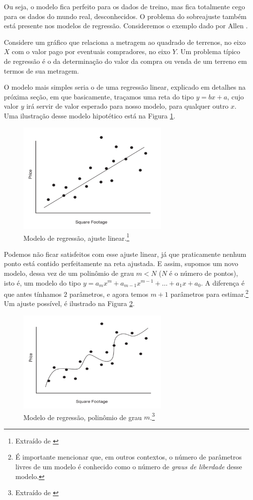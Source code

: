 Ou seja, o modelo fica perfeito para os dados de treino, mas fica totalmente cego para os dados do mundo real, desconhecidos. O problema do sobreajuste também está presente nos modelos de regressão. Consideremos o exemplo dado por Allen \citep{allen}.

Considere um gráfico que relaciona a metragem ao quadrado de terrenos, no eixo $X$ com o valor pago por eventuais compradores, no eixo $Y$. Um problema típico de regressão é o da determinação do valor da compra ou venda de um terreno em termos de sua metragem. 

O modelo mais simples seria o de uma regressão linear, explicado em detalhes na próxima seção, em que basicamente, traçamos uma reta do tipo $y = bx + a$, cujo valor $y$ irá servir de valor esperado para nosso modelo, para qualquer outro $x$. Uma ilustração desse modelo hipotético está na Figura \ref{fig:over_reg_1}.

\begin{figure}[htb]
\centering
\includegraphics[width=7.5cm]{figuras/over_reg_1}
\caption{Modelo de regressão, ajuste linear.\footnote{Extraído de \citep{allen}}}
\label{fig:over_reg_1}
\end{figure}

Podemos não ficar satisfeitos com esse ajuste linear, já que praticamente nenhum ponto está contido perfeitamente na reta ajustada. E assim, supomos um novo modelo, dessa vez de um polinômio de grau $m < N$ ($N$ é o número de pontos), isto é, um modelo do tipo $y = a_mx^m + a_{m-1}x^{m-1} + \ldots + a_1x + a_0$. A diferença é que antes tínhamos $2$ parâmetros, e agora temos $m{+}1$ parâmetros para estimar.\footnote{É importante mencionar que, em outros contextos, o número de parâmetros livres de um modelo é conhecido como o número de \emph{graus de liberdade} desse modelo.} Um ajuste possível, é ilustrado na Figura \ref{fig:over_reg_2}.

\begin{figure}[htb]
\centering
\includegraphics[width=7.5cm]{figuras/over_reg_2}
\caption{Modelo de regressão, polinômio de grau $m$.\footnote{Extraído de \citep{allen}}}
\label{fig:over_reg_2}
\end{figure}

